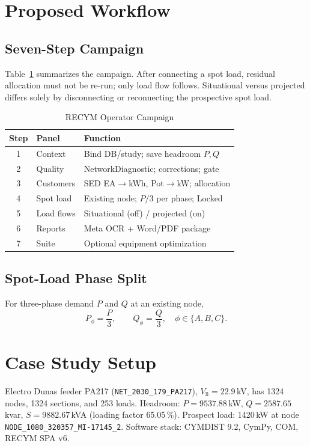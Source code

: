 \documentclass[journal]{IEEEtran}
\begin{document}
\section{Proposed Workflow}
\subsection{Seven-Step Campaign}
Table~\ref{tab:steps} summarizes the campaign.
After connecting a spot load, residual allocation must not be re-run; only load
flow follows.
Situational versus projected differs solely by disconnecting or reconnecting the
prospective spot load.

\begin{table}[!t]
\caption{RECYM Operator Campaign}
\label{tab:steps}
\centering
\begin{tabular}{@{}clp{5.6cm}@{}}
\toprule
Step & Panel & Function \\
\midrule
1 & Context & Bind DB/study; save headroom $P,Q$ \\
2 & Quality & NetworkDiagnostic; corrections; gate \\
3 & Customers & SED EA$\to$kWh, Pot$\to$kW; allocation \\
4 & Spot load & Existing node; $P/3$ per phase; Locked \\
5 & Load flows & Situational (off) / projected (on) \\
6 & Reports & Meta OCR + Word/PDF package \\
7 & Suite & Optional equipment optimization \\
\bottomrule
\end{tabular}
\end{table}

\subsection{Spot-Load Phase Split}
For three-phase demand $P$ and $Q$ at an existing node,
\begin{equation}
P_{\phi}=\frac{P}{3},\qquad Q_{\phi}=\frac{Q}{3},\quad \phi\in\{A,B,C\}.
\end{equation}

\section{Case Study Setup}
Electro Dunas feeder PA217 (\texttt{NET\_2030\_179\_PA217}),
$V_{\mathrm{ll}}=22.9$\,kV, has 1324 nodes, 1324 sections, and 253 loads.
Headroom: $P=9537.88$\,kW, $Q=2587.65$\,kvar, $S=9882.67$\,kVA
(loading factor 65.05\,\%).
Prospect load: 1420\,kW at node \texttt{NODE\_1080\_320357\_MI-17145\_2}.
Software stack: CYMDIST 9.2, CymPy, COM, RECYM SPA v6.
\end{document}
